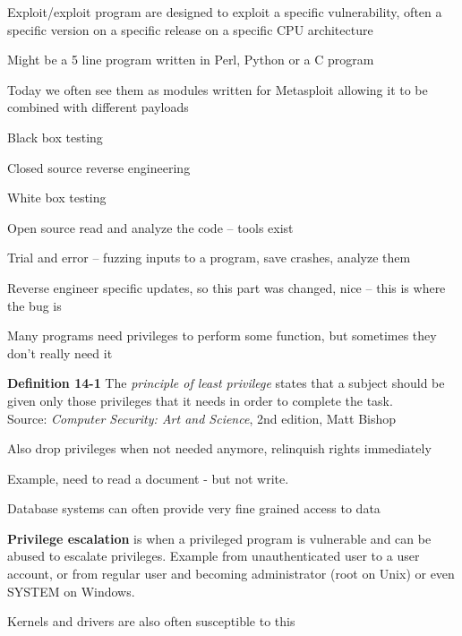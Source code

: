 \documentclass[Screen16to9,17pt]{foils}
\begin{document}
\begin{list2}
\item Exploit/exploit program are designed to exploit a specific vulnerability, often a specific version on a specific release on a specific CPU architecture
\item Might be a 5 line program written in Perl, Python or a C program
\item Today we often see them as modules written for Metasploit allowing it to be combined with different payloads
\end{list2}


\begin{list1}
\item Black box testing
\item Closed source reverse engineering
\item White box testing
\item Open source read and analyze the code -- tools exist
\item Trial and error -- fuzzing inputs to a program, save crashes, analyze them
\item Reverse engineer specific updates, so this part was changed, nice -- this is where the bug is
\end{list1}



\begin{list1}
\item Many programs need privileges to perform some function, but sometimes they don't really need it
\item {\bf Definition 14-1} The \emph{principle of least privilege} states that a subject should be given only those privileges that it needs in order to complete the task.\\
Source:  \emph{Computer Security: Art and Science}, 2nd edition, Matt Bishop

\item Also drop privileges when not needed anymore, relinquish rights immediately
\item Example, need to read a document - but not write.
\item Database systems can often provide very fine grained access to data
\end{list1}

\begin{list1}
\item {\bfseries Privilege escalation} is when a privileged program is vulnerable and can be abused to escalate privileges. Example from unauthenticated user to a user account, or from regular user and becoming administrator (root on Unix) or even SYSTEM on Windows.
\item Kernels and drivers are also often susceptible to this
\end{list1}
\end{document}
